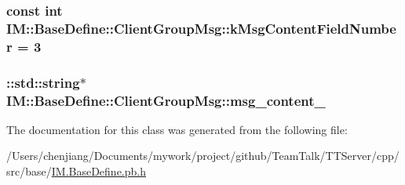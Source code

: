 \subsubsection[{k\+Msg\+Content\+Field\+Number}]{\setlength{\rightskip}{0pt plus 5cm}const int I\+M\+::\+Base\+Define\+::\+Client\+Group\+Msg\+::k\+Msg\+Content\+Field\+Number = 3\hspace{0.3cm}{\ttfamily [static]}}\label{class_i_m_1_1_base_define_1_1_client_group_msg_abf24f9d9e603bbd5c851df53e1af51b3}
\hypertarget{class_i_m_1_1_base_define_1_1_client_group_msg_a595d9562408c010673df7d09ab8e2521}{}
\subsubsection[{msg\+\_\+content\+\_\+}]{\setlength{\rightskip}{0pt plus 5cm}\+::std\+::string$\ast$ I\+M\+::\+Base\+Define\+::\+Client\+Group\+Msg\+::msg\+\_\+content\+\_\+\hspace{0.3cm}{\ttfamily [private]}}\label{class_i_m_1_1_base_define_1_1_client_group_msg_a595d9562408c010673df7d09ab8e2521}


The documentation for this class was generated from the following file\+:\begin{DoxyCompactItemize}
\item 
/\+Users/chenjiang/\+Documents/mywork/project/github/\+Team\+Talk/\+T\+T\+Server/cpp/src/base/\hyperlink{_i_m_8_base_define_8pb_8h}{I\+M.\+Base\+Define.\+pb.\+h}\end{DoxyCompactItemize}

